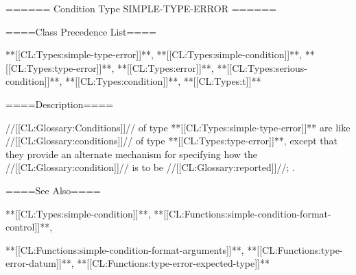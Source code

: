 ====== Condition Type SIMPLE-TYPE-ERROR ======

====Class Precedence List====

**[[CL:Types:simple-type-error]]**, **[[CL:Types:simple-condition]]**, **[[CL:Types:type-error]]**, **[[CL:Types:error]]**, **[[CL:Types:serious-condition]]**, **[[CL:Types:condition]]**, **[[CL:Types:t]]**

====Description====

//[[CL:Glossary:Conditions]]// of type **[[CL:Types:simple-type-error]]** are like //[[CL:Glossary:conditions]]// of type **[[CL:Types:type-error]]**, except that they provide an alternate mechanism for specifying how the //[[CL:Glossary:condition]]// is to be //[[CL:Glossary:reported]]//; .

====See Also====

**[[CL:Types:simple-condition]]**, **[[CL:Functions:simple-condition-format-control]]**,

**[[CL:Functions:simple-condition-format-arguments]]**, **[[CL:Functions:type-error-datum]]**, **[[CL:Functions:type-error-expected-type]]**

 
